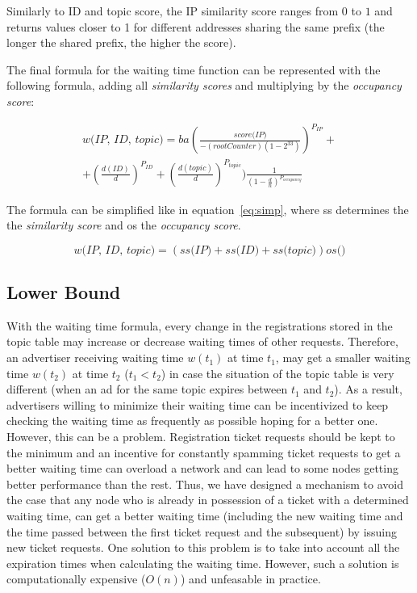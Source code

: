 Similarly to ID and topic score,  the IP similarity score ranges from $0$ to $1$ and returns values closer to 1 for different addresses sharing the same prefix (the longer the shared prefix, the higher the score).

The final formula for the waiting time function can be represented with  the following formula,  adding all \emph{similarity scores} and multiplying by the \emph{occupancy score}:

\begin{equation}
\begin{split}
    \textit{w(IP, ID, topic)} = 
    ba(\frac{\textit{score(IP)}}{-(\textit{rootCounter})(1 - 2^{33})})^{P_\textit{IP}} + \\
    + (\frac{d(ID)}{d})^{P_{ID}} +
    (\frac{d(topic)}{d})^{P_{topic}})
    \frac{1}{(1-\frac{d}{n})^{P_{occupancy}}}
\end{split}
\end{equation}

The formula can be simplified like in equation~\ref{eq:simp}, where ss determines the the \emph{similarity score} and os the \emph{occupancy score}.

\begin{equation}
\label{eq:simp}
    \textit{w(IP, ID, topic)} = 
    (\textit{ss(IP)} + 
    \textit{ss(ID)} + 
    \textit{ss(topic)})
    \textit{os()}
\end{equation}

\subsection{Lower Bound}
With the waiting time formula, every change in the registrations stored in  the topic table may increase or decrease waiting times of other requests. 
Therefore,  an advertiser receiving waiting time $w(t_1)$ at time $t_1$, may get a smaller waiting time $w(t_2)$ at time $t_2$ ($t_1 < t_2$) in case the situation of the topic table is very different (\eg when an ad for the same topic expires between $t_1$ and $t_2$). 
As a result,  advertisers willing to minimize their waiting time can be incentivized to keep checking the waiting time as frequently as possible hoping for a better one.
However, this can be a problem. 
Registration ticket requests should be kept to the minimum and an incentive for constantly spamming ticket requests to get a better waiting time can overload a network and can lead to some nodes getting better performance than the rest.
Thus, we have designed a mechanism to avoid the case that any node who is already in possession of a ticket with a determined waiting time, can get a better waiting time (including the new waiting time and the time passed between the first ticket request and the subsequent) by issuing new ticket requests.
One solution to this problem is to take into account all the expiration times when calculating the waiting time. 
However, such a solution is computationally expensive (\eg $O(n)$) and unfeasable in practice.

